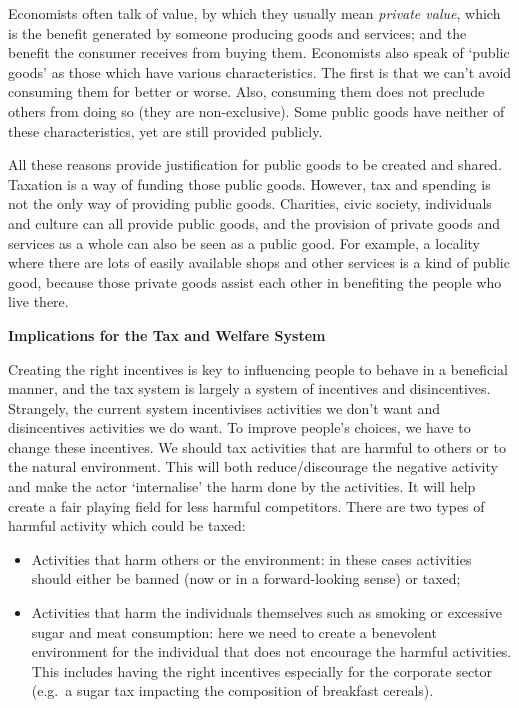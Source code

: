 \documentclass[]{tufte-handout}
\providecommand{\tightlist}{%
  \setlength{\itemsep}{0pt}\setlength{\parskip}{0pt}}
\begin{document}
Economists often talk of value, by which they usually mean \emph{private
value}, which is the benefit generated by someone producing goods and
services; and the benefit the consumer receives from buying them.
Economists also speak of `public goods' as those which have various
characteristics. The first is that we can't avoid consuming them for
better or worse. Also, consuming them does not preclude others from
doing so (they are non-exclusive). Some public goods have neither of
these characteristics, yet are still provided publicly.

All these reasons provide justification for public goods to be created
and shared. Taxation is a way of funding those public goods. However,
tax and spending is not the only way of providing public goods.
Charities, civic society, individuals and culture can all provide public
goods, and the provision of private goods and services as a whole can
also be seen as a public good. For example, a locality where there are
lots of easily available shops and other services is a kind of public
good, because those private goods assist each other in benefiting the
people who live there.

\textbf{Implications for the Tax and Welfare System}

Creating the right incentives is key to influencing people to behave in
a beneficial manner, and the tax system is largely a system of
incentives and disincentives. Strangely, the current system incentivises
activities we don't want and disincentives activities we do want. To
improve people's choices, we have to change these incentives. We should
tax activities that are harmful to others or to the natural environment.
This will both reduce/discourage the negative activity and make the
actor `internalise' the harm done by the activities. It will help create
a fair playing field for less harmful competitors. There are two types
of harmful activity which could be taxed:

\begin{itemize}
\tightlist
\item
  Activities that harm others or the environment: in these cases
  activities should either be banned (now or in a forward-looking sense)
  or taxed;
\item
  Activities that harm the individuals themselves such as smoking or
  excessive sugar and meat consumption: here we need to create a
  benevolent environment for the individual that does not encourage the
  harmful activities. This includes having the right incentives
  especially for the corporate sector (e.g.~a sugar tax impacting the
  composition of breakfast cereals).
\end{itemize}
\end{document}
